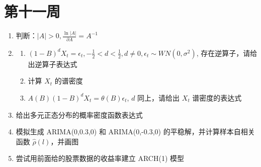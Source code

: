 \section{第十一周}
\begin{enumerate}
    \item 判断：$|A| > 0, \frac{\ln|A|}{\partial A} = A^{-1}$

    \item 
    \begin{enumerate}
        \item $(1 - B)^d X_t = \epsilon_t, -\frac{1}{2} < d < \frac{1}{2}, d \neq 0, \epsilon_t \sim WN(0, \sigma^2)$, 存在逆算子，请给出逆算子表达式
        \item 计算 $X_t$ 的谱密度
        \item $A(B)(1 - B)^d X_t = \theta(B)\epsilon_t$, $d$ 同上，请给出 $X_t$ 谱密度的表达式
    \end{enumerate}

    \item 给出多元正态分布的概率密度函数表达式

    \item 模拟生成 ARIMA(0,0.3,0) 和 ARIMA(0,-0.3,0) 的平稳解，并计算样本自相关函数 $\hat{\rho}(l)$，并画图

    \item 尝试用前面给的股票数据的收益率建立 ARCH(1) 模型

\end{enumerate}